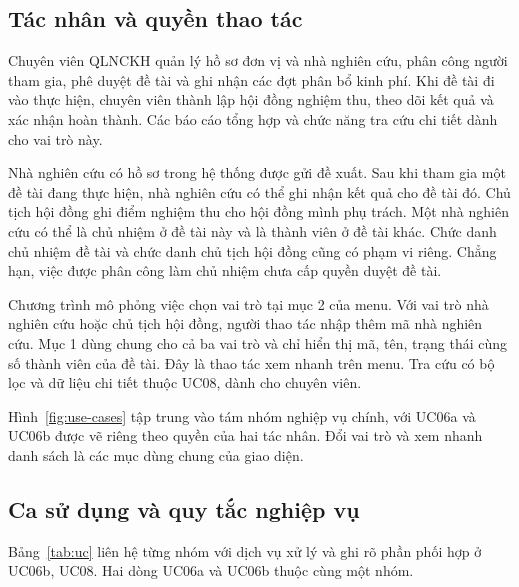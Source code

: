 
\label{sec:requirements}
\subsection{Tác nhân và quyền thao tác}\label{sec:actors}

Chuyên viên QLNCKH quản lý hồ sơ đơn vị và nhà nghiên cứu, phân công người tham gia, phê duyệt đề tài và ghi nhận các đợt phân bổ kinh phí. Khi đề tài đi vào thực hiện, chuyên viên thành lập hội đồng nghiệm thu, theo dõi kết quả và xác nhận hoàn thành. Các báo cáo tổng hợp và chức năng tra cứu chi tiết dành cho vai trò này.

Nhà nghiên cứu có hồ sơ trong hệ thống được gửi đề xuất. Sau khi tham gia một đề tài đang thực hiện, nhà nghiên cứu có thể ghi nhận kết quả cho đề tài đó. Chủ tịch hội đồng ghi điểm nghiệm thu cho hội đồng mình phụ trách. Một nhà nghiên cứu có thể là chủ nhiệm ở đề tài này và là thành viên ở đề tài khác. Chức danh chủ nhiệm đề tài và chức danh chủ tịch hội đồng cũng có phạm vi riêng. Chẳng hạn, việc được phân công làm chủ nhiệm chưa cấp quyền duyệt đề tài.

Chương trình mô phỏng việc chọn vai trò tại mục 2 của menu. Với vai trò nhà nghiên cứu hoặc chủ tịch hội đồng, người thao tác nhập thêm mã nhà nghiên cứu. Mục 1 dùng chung cho cả ba vai trò và chỉ hiển thị mã, tên, trạng thái cùng số thành viên của đề tài. Đây là thao tác xem nhanh trên menu. Tra cứu có bộ lọc và dữ liệu chi tiết thuộc UC08, dành cho chuyên viên.

Hình~\ref{fig:use-cases} tập trung vào tám nhóm nghiệp vụ chính, với UC06a và UC06b được vẽ riêng theo quyền của hai tác nhân. Đổi vai trò và xem nhanh danh sách là các mục dùng chung của giao diện.

\subsection{Ca sử dụng và quy tắc nghiệp vụ}\label{sec:use-cases}

Bảng~\ref{tab:uc} liên hệ từng nhóm với dịch vụ xử lý và ghi rõ phần phối hợp ở UC06b, UC08. Hai dòng UC06a và UC06b thuộc cùng một nhóm.

